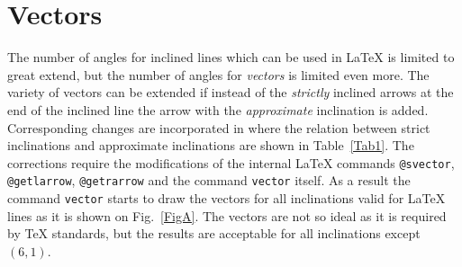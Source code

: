 \section*{Vectors}

The number of angles for inclined lines which can be used
in \LaTeX{} is limited to great extend, but the number of
angles for  {\em vectors} is limited even more.
The variety of vectors can be extended if instead of the
{\em strictly} inclined arrows at the end of the inclined
line the arrow with the {\em approximate} inclination is added.
Corresponding changes are incorporated in \pmg{} where
the relation between strict inclinations and approximate
inclinations are shown in Table~\ref{Tab1}. The corrections require
the modifications of the internal \LaTeX{} commands
{\tt\bs{}@svector}, {\tt\bs{}@getlarrow}, {\tt\bs{}@getrarrow}
and the command {\tt\bs{}vector} itself. As a result the command
{\tt\bs{}vector} starts to draw the vectors for all inclinations
valid for \LaTeX{} lines as it is shown on Fig.~\ref{FigA}.
The vectors are not so ideal as it is required by \TeX{} standards,
but the results are acceptable for all inclinations except $(6,1)$.

